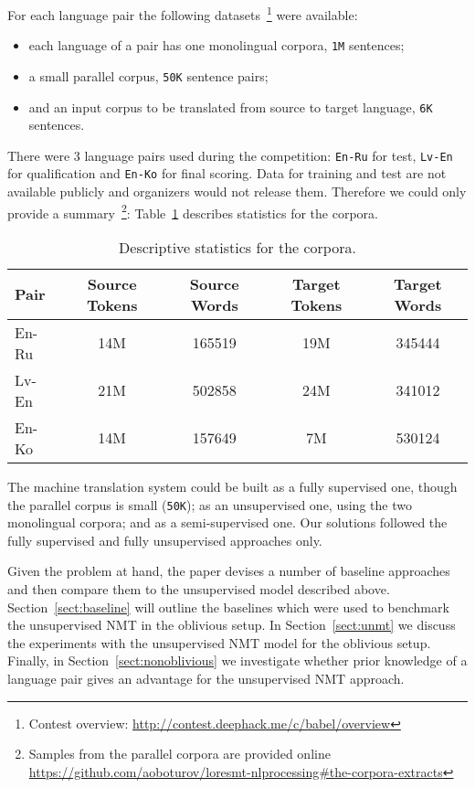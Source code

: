 \documentclass[]{article}
\begin{document}
For each language pair the following datasets~\footnote{Contest overview: \url{http://contest.deephack.me/c/babel/overview}} were available:
\begin{itemize}
  \item each language of a pair has one monolingual corpora, {\tt 1M} sentences;
  \item a small parallel corpus, {\tt 50K} sentence pairs;
  \item and an input corpus to be translated from source to target language, {\tt 6K} sentences.
\end{itemize}
There were 3 language pairs used during the competition: {\tt En-Ru} for test, {\tt Lv-En} for qualification and {\tt En-Ko} for final scoring.
Data for training and test are not available publicly and organizers would not release them.
Therefore we could only provide a summary~\footnote{Samples from the parallel corpora are provided online \url{https://github.com/aoboturov/loresmt-nlprocessing\#the-corpora-extracts}}: Table~\ref{table:corpora_stats} describes statistics for the corpora.

\begin{table}[h!]
\begin{center}
\begin{tabular}{ l c c c c }
Pair & Source Tokens & Source Words & Target Tokens & Target Words \\
\hline
En-Ru & 14M & 165519 & 19M & 345444 \\
Lv-En & 21M & 502858 & 24M & 341012 \\
En-Ko & 14M & 157649 & 7M & 530124 \\
\end{tabular}
\end{center}
\caption{Descriptive statistics for the corpora.}
\label{table:corpora_stats}
\end{table}

The machine translation system could be built as a fully supervised one, though the parallel corpus is small ({\tt 50K}); as an unsupervised one, using the two monolingual corpora; and as a semi-supervised one.
Our solutions followed the fully supervised and fully unsupervised approaches only.

Given the problem at hand, the paper devises a number of baseline approaches and then compare them to the unsupervised model described above.
Section~\ref{sect:baseline} will outline the baselines which were used to benchmark the unsupervised \ac{NMT} in the oblivious setup.
In Section~\ref{sect:unmt} we discuss the experiments with the unsupervised \ac{NMT} model for the oblivious setup.
Finally, in Section~\ref{sect:nonoblivious} we investigate whether prior knowledge of a language pair gives an advantage for the unsupervised \ac{NMT} approach.
\end{document}
